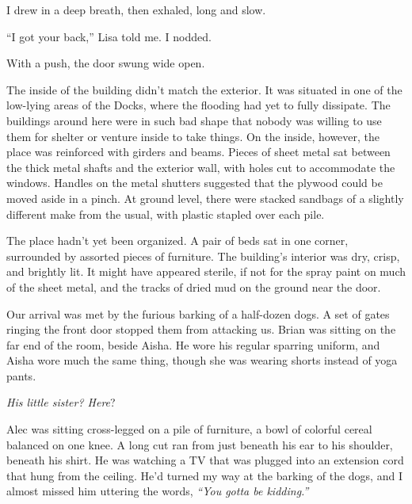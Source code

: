 








I drew in a deep breath, then exhaled, long and slow.



``I got your back,'' Lisa told me.  I nodded.



With a push, the door swung wide open.



The inside of the building didn't match the exterior.  It was situated in one of the low-lying areas of the Docks, where the flooding had yet to fully dissipate.  The buildings around here were in such bad shape that nobody was willing to use them for shelter or venture inside to take things.  On the inside, however, the place was reinforced with girders and beams.  Pieces of sheet metal sat between the thick metal shafts and the exterior wall, with holes cut to accommodate the windows.  Handles on the metal shutters suggested that the plywood could be moved aside in a pinch.  At ground level, there were stacked sandbags of a slightly different make from the usual, with plastic stapled over each pile.



The place hadn't yet been organized.  A pair of beds sat in one corner, surrounded by assorted pieces of furniture.  The building's interior was dry, crisp, and brightly lit.  It might have appeared sterile, if not for the spray paint on much of the sheet metal, and the tracks of dried mud on the ground near the door.



Our arrival was met by the furious barking of a half-dozen dogs.  A set of gates ringing the front door stopped them from attacking us.  Brian was sitting on the far end of the room, beside Aisha.  He wore his regular sparring uniform, and Aisha wore much the same thing, though she was wearing shorts instead of yoga pants.



\emph{His little sister? Here}?



Alec was sitting cross-legged on a pile of furniture, a bowl of colorful cereal balanced on one knee.  A long cut ran from just beneath his ear to his shoulder, beneath his shirt.  He was watching a TV that was plugged into an extension cord that hung from the ceiling.  He'd turned my way at the barking of the dogs, and I almost missed him uttering the words, \emph{``You gotta be kidding.''}



